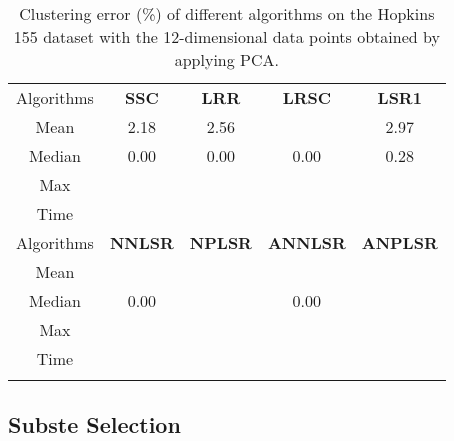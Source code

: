 \documentclass[10pt,twocolumn,letterpaper]{article}
\renewcommand{\huge}{\fontsize{8.6pt}{\baselineskip}\selectfont}
\begin{document}
\begin{table}[hbp]
\caption{Clustering error (\%) of different algorithms on the Hopkins 155 dataset \cite{hopkins} with the 12-dimensional data points obtained by applying PCA.}
\label{t3}
\vspace{-4mm}
\begin{center}
\renewcommand\arraystretch{1}
\scriptsize
\begin{tabular}{ccccc}
\Xhline{0.5pt}
Algorithms
&
\textbf{SSC}\cite{ssc}
&
\textbf{LRR}\cite{lrr}
&
\textbf{LRSC}\cite{lrsc}
&
\textbf{LSR1}\cite{lsr}
\\
\Xhline{1.2pt}
Mean & 2.18 & 2.56 &  & 2.97 
\\
\Xhline{0.5pt}
Median & 0.00 & 0.00 & 0.00 & 0.28
\\
\Xhline{0.5pt}
Max &  &  &  &  
\\
\Xhline{0.5pt}
Time &  &  &  &  
\\
\Xhline{0.5pt}
Algorithms
&
\textbf{NNLSR}
&
\textbf{NPLSR}
&
\textbf{ANNLSR}
&
\textbf{ANPLSR}
\\
\Xhline{1.2pt}
Mean &  &  &  &  
\\
\Xhline{0.5pt}
Median & 0.00 &  & 0.00 &  
\\
\Xhline{0.5pt}
Max &  &  &  &  
\\
\Xhline{0.5pt}
Time &  &  &  &  
\\
\Xhline{0.5pt} 
\end{tabular}
\end{center}
\vspace{-3mm}
\end{table}


\subsection{Subste Selection}
\end{document}

